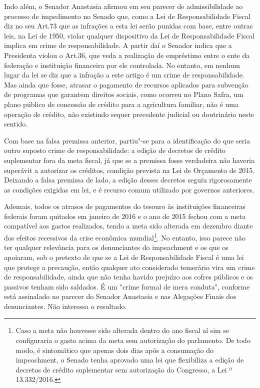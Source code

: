 Indo além, o Senador Anastasia afirmou em seu parecer de admissibilidade
ao processo de impedimento no Senado que, como a Lei de Responsabilidade
Fiscal diz no seu Art.73 que as infrações a esta lei serão punidas com
base, entre outras leis, na Lei de 1950, violar qualquer dispositivo da
Lei de Responsabilidade Fiscal implica em crime de responsabilidade. A
partir daí o Senador indica que a Presidenta violou o Art.36, que veda a
realização de empréstimo entre o ente da federação e instituição
financeira por ele controlada. No entanto, em nenhum lugar da lei se diz
que a infração a este artigo é um crime de responsabilidade. Mas ainda
que fosse, atrasar o pagamento de recursos aplicados para subvenção de
programas que garantem direitos sociais, como ocorreu no Plano Safra, um
plano público de concessão de crédito para a agricultura familiar, não é
uma operação de crédito, não existindo sequer precedente judicial ou
doutrinário neste sentido.

Com base na falsa premissa anterior, partiu"-se para a identificação do
que seria outro suposto crime de responsabilidade: a edição de decretos
de crédito suplementar fora da meta fiscal, já que se a premissa fosse
verdadeira não haveria superávit a autorizar os créditos, condição
prevista na Lei de Orçamento de 2015. Deixando a falsa premissa de lado,
a edição desses decretos seguiu rigorosamente as condições exigidas em
lei, e é recurso comum utilizado por governos anteriores.

Ademais, todos os atrasos de pagamentos do tesouro às instituições
financeiras federais foram quitados em janeiro de 2016 e o ano de 2015
fechou com a meta compatível aos gastos realizados, tendo a meta sido
alterada em dezembro diante dos efeitos recessivos da crise econômica
mundial\footnote{Caso a meta não houvesse sido alterada dentro do ano
  fiscal aí sim se configuraria o gasto acima da meta sem autorização do
  parlamento. De todo modo, é sintomático que apenas dois dias após a
  consumação do impeachment, o Senado tenha aprovado uma lei que
  flexibiliza a edição de decretos de crédito suplementar sem
  autorização do Congresso, a Lei º 13.332/2016.}. No entanto, isso
parece não ter qualquer relevância para os denunciantes do impeachment e
os que os apoiaram, sob o pretexto de que se a Lei de Responsabilidade
Fiscal é uma lei que protege a precaução, então qualquer ato considerado
temerário vira um crime de responsabilidade, ainda que não tenha havido
prejuízo aos cofres públicos e os passivos tenham sido saldados. É um
"crime formal de mera conduta", conforme está assinalado no parecer do
Senador Anastasia e nas Alegações Finais dos denunciantes. Não interessa
o resultado.

